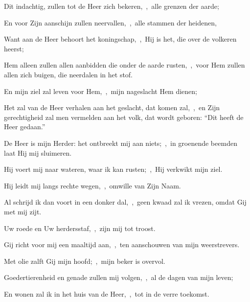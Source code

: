 \documentclass[12pt,twoside,a5paper]{article}
\begin{document}

\begin{halfparskip}
  Dit indachtig, zullen tot de Heer zich bekeren,~\sep\ alle grenzen der aarde;

  En voor Zijn aanschijn zullen neervallen,~\sep\ alle stammen der heidenen,

  Want aan de Heer behoort het koningschap,~\sep\ Hij is het, die over de volkeren heerst;

  Hem alleen zullen allen aanbidden die onder de aarde rusten,~\sep\ voor Hem zullen allen zich buigen, die neerdalen in het stof.

  En mijn ziel zal leven voor Hem,~\sep\ mijn nageslacht Hem dienen;

  Het zal van de Heer verhalen aan het geslacht, dat komen zal,~\sep\ en Zijn gerechtigheid zal men vermelden aan het volk, dat wordt geboren: ``Dit heeft de Heer gedaan.''
\end{halfparskip}



\begin{halfparskip}
  De Heer is mijn Herder: het ontbreekt mij aan niets;~\sep\ in groenende beemden laat Hij mij sluimeren.


  Hij voert mij naar wateren, waar ik kan rusten;~\sep\ Hij verkwikt mijn ziel.

  Hij leidt mij langs rechte wegen,~\sep\ omwille van Zijn Naam.

  Al schrijd ik dan voort in een donker dal,~\sep\ geen kwaad zal ik vrezen, omdat Gij met mij zijt.

  Uw roede en Uw herdersstaf,~\sep\ zijn mij tot troost.
\end{halfparskip}


\begin{halfparskip}
  Gij richt voor mij een maaltijd aan,~\sep\ ten aanschouwen van mijn weerstrevers.

  Met olie zalft Gij mijn hoofd;~\sep\ mijn beker is overvol.

  Goedertierenheid en genade zullen mij volgen,~\sep\ al de dagen van mijn leven;

  En wonen zal ik in het huis van de Heer,~\sep\ tot in de verre toekomst.
\end{halfparskip}
\end{document}
